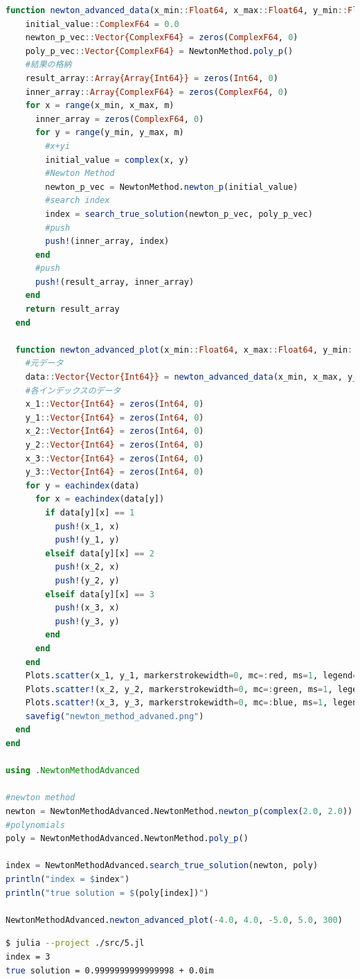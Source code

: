 \documentclass[uplatex, dvipdfmx, a4j,11pt]{jsarticle}
\begin{document}
\begin{lstlisting}[title={課題5の全体のプログラム}, label=code:in, language=Julia]
  function newton_advanced_data(x_min::Float64, x_max::Float64, y_min::Float64, y_max::Float64, m::Int64)::Vector{Vector{Int64}}
    initial_value::ComplexF64 = 0.0
    newton_p_vec::Vector{ComplexF64} = zeros(ComplexF64, 0)
    poly_p_vec::Vector{ComplexF64} = NewtonMethod.poly_p()
    #結果の格納
    result_array::Array{Array{Int64}} = zeros(Int64, 0)
    inner_array::Array{ComplexF64} = zeros(ComplexF64, 0)
    for x = range(x_min, x_max, m)
      inner_array = zeros(ComplexF64, 0)
      for y = range(y_min, y_max, m)
        #x+yi
        initial_value = complex(x, y)
        #Newton Method
        newton_p_vec = NewtonMethod.newton_p(initial_value)
        #search index
        index = search_true_solution(newton_p_vec, poly_p_vec)
        #push
        push!(inner_array, index)
      end
      #push
      push!(result_array, inner_array)
    end
    return result_array
  end
  
  function newton_advanced_plot(x_min::Float64, x_max::Float64, y_min::Float64, y_max::Float64, m::Int64)
    #元データ
    data::Vector{Vector{Int64}} = newton_advanced_data(x_min, x_max, y_min, y_max, m)
    #各インデックスのデータ
    x_1::Vector{Int64} = zeros(Int64, 0)
    y_1::Vector{Int64} = zeros(Int64, 0)
    x_2::Vector{Int64} = zeros(Int64, 0)
    y_2::Vector{Int64} = zeros(Int64, 0)
    x_3::Vector{Int64} = zeros(Int64, 0)
    y_3::Vector{Int64} = zeros(Int64, 0)
    for y = eachindex(data)
      for x = eachindex(data[y])
        if data[y][x] == 1
          push!(x_1, x)
          push!(y_1, y)
        elseif data[y][x] == 2
          push!(x_2, x)
          push!(y_2, y)
        elseif data[y][x] == 3
          push!(x_3, x)
          push!(y_3, y)
        end
      end
    end
    Plots.scatter(x_1, y_1, markerstrokewidth=0, mc=:red, ms=1, legend=false)
    Plots.scatter!(x_2, y_2, markerstrokewidth=0, mc=:green, ms=1, legend=false)
    Plots.scatter!(x_3, y_3, markerstrokewidth=0, mc=:blue, ms=1, legend=false)
    savefig("newton_method_advaned.png")
  end
end

using .NewtonMethodAdvanced

#newton method
newton = NewtonMethodAdvanced.NewtonMethod.newton_p(complex(2.0, 2.0))
#polynomials
poly = NewtonMethodAdvanced.NewtonMethod.poly_p()

index = NewtonMethodAdvanced.search_true_solution(newton, poly)
println("index = $index")
println("true solution = $(poly[index])")

NewtonMethodAdvanced.newton_advanced_plot(-4.0, 4.0, -5.0, 5.0, 300)
\end{lstlisting}

\newpage
\begin{lstlisting}[title={課題5のプログラムの実行結果}, label=code:in, language=sh]
$ julia --project ./src/5.jl
index = 3
true solution = 0.9999999999999998 + 0.0im
\end{lstlisting}
\end{document}

